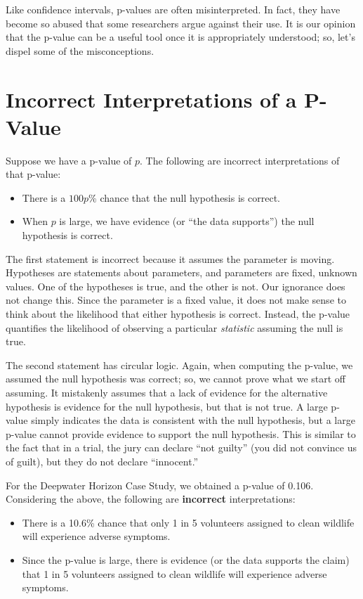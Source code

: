 \documentclass[
  letterpaper,
  DIV=11,
  numbers=noendperiod]{scrreprt}
\providecommand{\tightlist}{%
  \setlength{\itemsep}{0pt}\setlength{\parskip}{0pt}}\usepackage{longtable,booktabs,array}
\theoremstyle{plain}
\theoremstyle{definition}
\theoremstyle{definition}
\theoremstyle{remark}
\begin{document}
Like confidence intervals, p-values are often misinterpreted. In fact,
they have become so abused that some researchers argue against their
use. It is our opinion that the p-value can be a useful tool once it is
appropriately understood; so, let's dispel some of the misconceptions.

\section{Incorrect Interpretations of a
P-Value}\label{incorrect-interpretations-of-a-p-value}

Suppose we have a p-value of \(p\). The following are incorrect
interpretations of that p-value:

\begin{itemize}
\tightlist
\item
  There is a \(100p\)\% chance that the null hypothesis is correct.
\item
  When \(p\) is large, we have evidence (or ``the data supports'') the
  null hypothesis is correct.
\end{itemize}

The first statement is incorrect because it assumes the parameter is
moving. Hypotheses are statements about parameters, and parameters are
fixed, unknown values. One of the hypotheses is true, and the other is
not. Our ignorance does not change this. Since the parameter is a fixed
value, it does not make sense to think about the likelihood that either
hypothesis is correct. Instead, the p-value quantifies the likelihood of
observing a particular \emph{statistic} assuming the null is true.

The second statement has circular logic. Again, when computing the
p-value, we assumed the null hypothesis was correct; so, we cannot prove
what we start off assuming. It mistakenly assumes that a lack of
evidence for the alternative hypothesis is evidence for the null
hypothesis, but that is not true. A large p-value simply indicates the
data is consistent with the null hypothesis, but a large p-value cannot
provide evidence to support the null hypothesis. This is similar to the
fact that in a trial, the jury can declare ``not guilty'' (you did not
convince us of guilt), but they do not declare ``innocent.''

For the Deepwater Horizon Case Study, we obtained a p-value of 0.106.
Considering the above, the following are \textbf{incorrect}
interpretations:

\begin{itemize}
\tightlist
\item
  There is a 10.6\% chance that only 1 in 5 volunteers assigned to clean
  wildlife will experience adverse symptoms.
\item
  Since the p-value is large, there is evidence (or the data supports
  the claim) that 1 in 5 volunteers assigned to clean wildlife will
  experience adverse symptoms.
\end{itemize}
\end{document}
